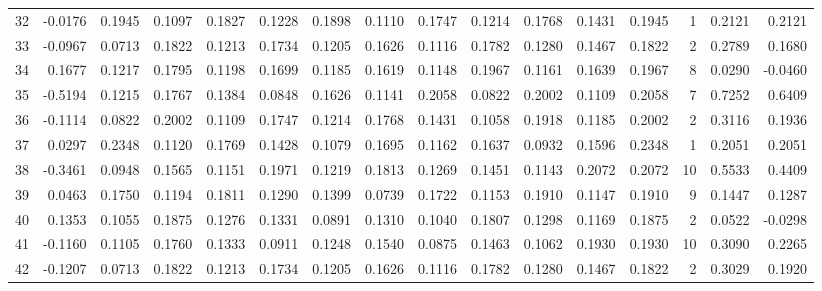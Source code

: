 \begin{tabular}{lrrrrrrrrrrrrrrr}
32  &     -0.0176 &  0.1945 &  0.1097 &  0.1827 &  0.1228 &  0.1898 &  0.1110 &  0.1747 &  0.1214 &  0.1768 &   0.1431 &     0.1945 &      1 &                    0.2121 &                     0.2121 \\
33  &     -0.0967 &  0.0713 &  0.1822 &  0.1213 &  0.1734 &  0.1205 &  0.1626 &  0.1116 &  0.1782 &  0.1280 &   0.1467 &     0.1822 &      2 &                    0.2789 &                     0.1680 \\
34  &      0.1677 &  0.1217 &  0.1795 &  0.1198 &  0.1699 &  0.1185 &  0.1619 &  0.1148 &  0.1967 &  0.1161 &   0.1639 &     0.1967 &      8 &                    0.0290 &                    -0.0460 \\
35  &     -0.5194 &  0.1215 &  0.1767 &  0.1384 &  0.0848 &  0.1626 &  0.1141 &  0.2058 &  0.0822 &  0.2002 &   0.1109 &     0.2058 &      7 &                    0.7252 &                     0.6409 \\
36  &     -0.1114 &  0.0822 &  0.2002 &  0.1109 &  0.1747 &  0.1214 &  0.1768 &  0.1431 &  0.1058 &  0.1918 &   0.1185 &     0.2002 &      2 &                    0.3116 &                     0.1936 \\
37  &      0.0297 &  0.2348 &  0.1120 &  0.1769 &  0.1428 &  0.1079 &  0.1695 &  0.1162 &  0.1637 &  0.0932 &   0.1596 &     0.2348 &      1 &                    0.2051 &                     0.2051 \\
38  &     -0.3461 &  0.0948 &  0.1565 &  0.1151 &  0.1971 &  0.1219 &  0.1813 &  0.1269 &  0.1451 &  0.1143 &   0.2072 &     0.2072 &     10 &                    0.5533 &                     0.4409 \\
39  &      0.0463 &  0.1750 &  0.1194 &  0.1811 &  0.1290 &  0.1399 &  0.0739 &  0.1722 &  0.1153 &  0.1910 &   0.1147 &     0.1910 &      9 &                    0.1447 &                     0.1287 \\
40  &      0.1353 &  0.1055 &  0.1875 &  0.1276 &  0.1331 &  0.0891 &  0.1310 &  0.1040 &  0.1807 &  0.1298 &   0.1169 &     0.1875 &      2 &                    0.0522 &                    -0.0298 \\
41  &     -0.1160 &  0.1105 &  0.1760 &  0.1333 &  0.0911 &  0.1248 &  0.1540 &  0.0875 &  0.1463 &  0.1062 &   0.1930 &     0.1930 &     10 &                    0.3090 &                     0.2265 \\
42  &     -0.1207 &  0.0713 &  0.1822 &  0.1213 &  0.1734 &  0.1205 &  0.1626 &  0.1116 &  0.1782 &  0.1280 &   0.1467 &     0.1822 &      2 &                    0.3029 &                     0.1920 \\

\end{tabular}
